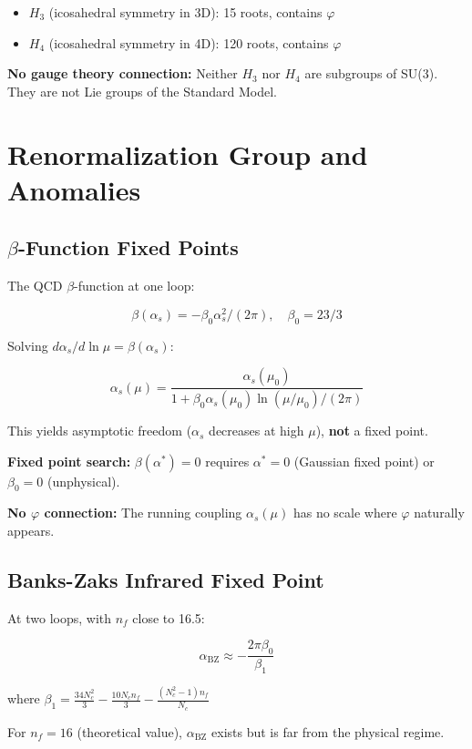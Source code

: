 \documentclass{article}
\begin{document}
\begin{itemize}
\item $H_3$ (icosahedral symmetry in 3D): 15 roots, contains $\varphi$
\item $H_4$ (icosahedral symmetry in 4D): 120 roots, contains $\varphi$
\end{itemize}

\textbf{No gauge theory connection:} Neither $H_3$ nor $H_4$ are subgroups of SU(3). They are not Lie groups of the Standard Model.

\section{Renormalization Group and Anomalies}

\subsection{$\beta$-Function Fixed Points}

The QCD $\beta$-function at one loop:

\[
\beta(\alpha_s) = -\beta_0 \alpha_s^2/(2\pi), \quad \beta_0 = 23/3
\]

Solving $d\alpha_s/d\ln\mu = \beta(\alpha_s)$:

\[
\alpha_s(\mu) = \frac{\alpha_s(\mu_0)}{1 + \beta_0 \alpha_s(\mu_0) \ln(\mu/\mu_0)/(2\pi)}
\]

This yields asymptotic freedom ($\alpha_s$ decreases at high $\mu$), \textbf{not} a fixed point.

\textbf{Fixed point search:} $\beta(\alpha^*) = 0$ requires $\alpha^* = 0$ (Gaussian fixed point) or $\beta_0 = 0$ (unphysical).

\textbf{No $\varphi$ connection:} The running coupling $\alpha_s(\mu)$ has no scale where $\varphi$ naturally appears.

\subsection{Banks-Zaks Infrared Fixed Point}

At two loops, with $n_f$ close to 16.5:

\[
\alpha_{\text{BZ}} \approx -\frac{2\pi \beta_0}{\beta_1}
\]

where $\beta_1 = \frac{34N_c^2}{3} - \frac{10N_c n_f}{3} - \frac{(N_c^2 - 1)n_f}{N_c}$

For $n_f = 16$ (theoretical value), $\alpha_{\text{BZ}}$ exists but is far from the physical regime.
\end{document}
